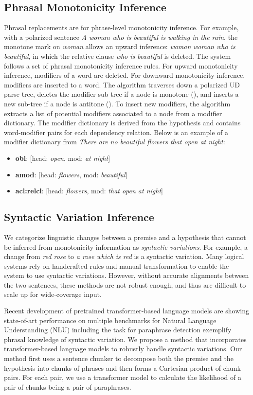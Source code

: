 \documentclass[11pt,a4paper]{article}
\begin{document}
\subsection{Phrasal Monotonicity Inference}
Phrasal replacements are for phrase-level monotonicity inference. For example, with a polarized sentence
\textit{A  woman who is beautiful is walking in the rain}, the monotone mark  on \textit{woman} allows an upward inference: \textit{woman}  \textit{woman who is beautiful}, in which the relative clause \textit{who is beautiful} is deleted.   
The system follows a set of phrasal monotonicity inference rules. For upward monotonicity inference, modifiers of a word are deleted. For downward monotonicity inference, modifiers are inserted to a word. The algorithm traverses down a polarized UD parse tree, deletes the modifier sub-tree if a node is monotone (), and inserts a new sub-tree if a node is antitone (). To insert new modifiers, the algorithm extracts a list of potential modifiers associated to a node from a modifier dictionary. The modifier dictionary is derived from the hypothesis and contains word-modifier pairs for each dependency relation. Below is an example of a modifier dictionary from \textit{There are no beautiful flowers that open at night}:
\begin{itemize}
    \small 
    \item \textbf{obl}: [{head: \textit{open}, mod: \textit{at night}}]
    \item \textbf{amod}: [{head: \textit{flowers}, mod: \textit{beautiful}}]
    \item \textbf{acl:relcl}: [{head: \textit{flowers}, mod: \textit{that open at night}}]
\end{itemize}


\subsection{Syntactic Variation Inference}
We categorize linguistic changes between a premise and a hypothesis that cannot be inferred from monotonicity information as \emph{syntactic variations}. For example, a change from \textit{red rose} to \textit{a rose which is red} is a syntactic variation. Many logical systems rely on handcrafted rules and manual transformation to enable the system 
to use syntactic variations. However, without accurate alignments between the two sentences, these methods are not robust enough, and thus are difficult to scale up for wide-coverage input. 

Recent development of pretrained transformer-based language models are showing state-of-art performance on multiple benchmarks for Natural Language Understanding (NLU) including the task for paraphrase detection \cite{devlin-etal-2019-bert, Lan2020ALBERT:, liu2020roberta}
exemplify phrasal knowledge of syntactic variation. We propose a method that incorporates transformer-based language models to robustly handle syntactic variations. Our method first uses a sentence chunker to decompose both the premise and the hypothesis into chunks of phrases and then forms a Cartesian product of chunk pairs. For each pair, we use a transformer model to calculate the likelihood of a pair of chunks being a pair of paraphrases.  
\end{document}
